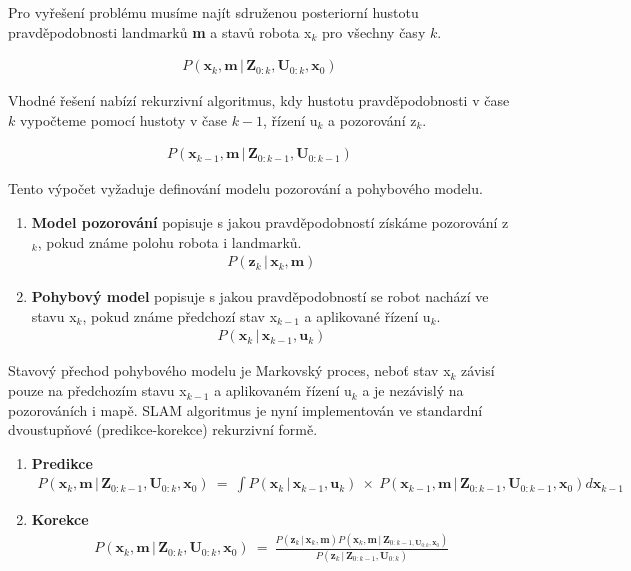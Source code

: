 \documentclass[12pt,a4paper]{article}
\begin{document}
Pro vyřešení problému musíme najít sdruženou posteriorní hustotu pravděpodobnosti landmarků \textbf{m} a stavů robota x$_k$ pro všechny časy $k$.

\begin{eqnarray}
P(\textbf{x}_k, \textbf{m} \,|\, \textbf{Z}_{0:k}, \textbf{U}_{0:k}, \textbf{x}_0)
\end{eqnarray}

Vhodné řešení nabízí rekurzivní algoritmus, kdy hustotu pravděpodobnosti v čase $k$ vypočteme pomocí hustoty v čase $k-1$, řízení u$_k$ a pozorování z$_k$.

\begin{eqnarray}
P(\textbf{x}_{k-1}, \textbf{m} \,|\, \textbf{Z}_{0:k-1}, \textbf{U}_{0:k-1})
\end{eqnarray}

Tento výpočet vyžaduje definování modelu pozorování a pohybového modelu.

\begin{enumerate}
\item \textbf{Model pozorování} popisuje s jakou pravděpodobností získáme pozorování z$_k$, pokud známe polohu robota i landmarků.
\begin{eqnarray}
P(\textbf{z}_k \,|\, \textbf{x}_k, \textbf{m})
\end{eqnarray}
\item \textbf{Pohybový model} popisuje s jakou pravděpodobností se robot nachází ve stavu x$_k$, pokud známe předchozí stav x$_{k-1}$ a aplikované řízení u$_k$.
\begin{eqnarray}
P(\textbf{x}_k \,|\, \textbf{x}_{k-1}, \textbf{u}_k)
\end{eqnarray}
\end{enumerate}

Stavový přechod pohybového modelu je Markovský proces, neboť stav x$_k$ závisí pouze na předchozím stavu x$_{k-1}$ a aplikovaném řízení u$_k$ a je nezávislý na pozorováních i mapě. SLAM algoritmus je nyní implementován ve standardní dvoustupňové (predikce-korekce) rekurzivní formě.

\newpage

\begin{enumerate}
\item \textbf{Predikce} 
\begin{eqnarray}
P(\textbf{x}_k, \textbf{m} \,|\, \textbf{Z}_{0:k-1}, \textbf{U}_{0:k}, \textbf{x}_0) \: = \: \int P(\textbf{x}_k \,|\, \textbf{x}_{k-1}, \textbf{u}_k) \: \times \: P(\textbf{x}_{k-1}, \textbf{m} \,|\, \textbf{Z}_{0:k-1}, \textbf{U}_{0:k-1}, \textbf{x}_0) d\textbf{x}_{k-1}  
\end{eqnarray}
\item \textbf{Korekce}
\begin{eqnarray}
P(\textbf{x}_k, \textbf{m} \,|\, \textbf{Z}_{0:k}, \textbf{U}_{0:k}, \textbf{x}_0) \: = \: \frac{P(\textbf{z}_k \,|\, \textbf{x}_k, \textbf{m}) P(\textbf{x}_k, \textbf{m} \,|\, \textbf{Z}_{0:k-1, \textbf{U}_{0:k}, \textbf{x}_0})}{P(\textbf{z}_k \,|\, \textbf{Z}_{0:k-1}, \textbf{U}_{0:k})}
\end{eqnarray}
\end{enumerate}
\end{document}
